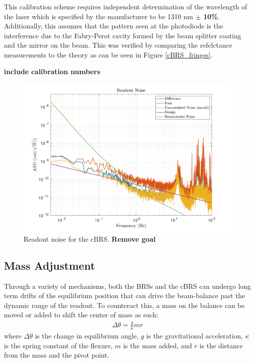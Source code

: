 \documentclass [12pt, proquest]{uwthesis}[2019]
\begin{document}
This calibration scheme requires independent determination of the wavelength of the laser which is specified by the manufacturer to be 1310 nm \textbf{$\pm$ 10\%}. Additionally, this assumes that the pattern seen at the photodiode is the interference due to the Fabry-Perot cavity formed by the beam splitter coating and the mirror on the beam. This was verified by comparing the refelctance measurements to the theory as can be seen in Figure \ref{cBRS_fringes}.

\textbf{include calibration numbers}

\begin{figure}%
\begin{center}
 \includegraphics[width=\textwidth]{cBRS_ReadoutNoise.pdf}
\caption{Readout noise for the cBRS. \textbf{Remove goal}}
\label{cBRS_readout}
\end{center}
\end{figure}

\subsection{Mass Adjustment}

Through a variety of mechanisms, both the BRSs and the cBRS can undergo long term drifts of the equilibrium position that can drive the beam-balance past the dynamic range of the readout. To counteract this, a mass on the balance can be moved or added to shift the center of mass as such:
\begin{align}
\Delta \theta=\frac{g}{\kappa} m r
\end{align}
where $\Delta \theta$ is the change in equilibrium angle, $g$ is the gravitational acceleration, $\kappa$ is the spring constant of the flexure, $m$ is the mass added, and $r$ is the distance from the mass and the pivot point.
\end{document}
